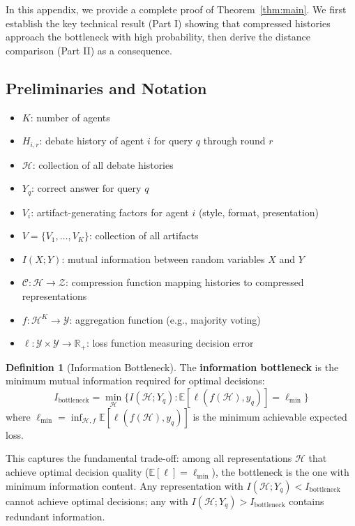 \documentclass{article}
\theoremstyle{plain}
\theoremstyle{definition}
\newtheorem{definition}[theorem]{Definition}
\theoremstyle{remark}
\begin{document}
In this appendix, we provide a complete proof of Theorem~\ref{thm:main}. We first establish the key technical result (Part I) showing that compressed histories approach the bottleneck with high probability, then derive the distance comparison (Part II) as a consequence.

\subsection{Preliminaries and Notation}

\begin{itemize}
    \item $K$: number of agents
    \item $H_{i,r}$: debate history of agent $i$ for query $q$ through round $r$
    \item $\mathcal{H}$: collection of all debate histories
    \item $Y_q$: correct answer for query $q$
    \item $V_i$: artifact-generating factors for agent $i$ (style, format, presentation)
    \item $V = \{V_1, \ldots, V_K\}$: collection of all artifacts
    \item $I(X; Y)$: mutual information between random variables $X$ and $Y$
    \item $\mathcal{C} : \mathcal{H} \to \mathcal{Z}$: compression function mapping histories to compressed representations
    \item $f : \mathcal{H}^K \to \mathcal{Y}$: aggregation function (e.g., majority voting)
    \item $\ell : \mathcal{Y} \times \mathcal{Y} \to \mathbb{R}_+$: loss function measuring decision error
\end{itemize}

\begin{definition}[Information Bottleneck]
\label{def:bottleneck_detailed}
The \textbf{information bottleneck} is the minimum mutual information required for optimal decisions:
\begin{equation}
I_{\text{bottleneck}} = \min_{\mathcal{H}} \{I(\mathcal{H}; Y_q) : \mathbb{E}[\ell(f(\mathcal{H}), y_q)] = \ell_{\min}\}
\end{equation}
where $\ell_{\min} = \inf_{\mathcal{H}, f} \mathbb{E}[\ell(f(\mathcal{H}), y_q)]$ is the minimum achievable expected loss.

This captures the fundamental trade-off: among all representations $\mathcal{H}$ that achieve optimal decision quality ($\mathbb{E}[\ell] = \ell_{\min}$), the bottleneck is the one with minimum information content. Any representation with $I(\mathcal{H}; Y_q) < I_{\text{bottleneck}}$ cannot achieve optimal decisions; any with $I(\mathcal{H}; Y_q) > I_{\text{bottleneck}}$ contains redundant information.
\end{definition}
\end{document}
